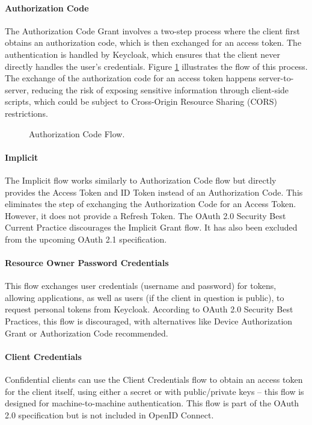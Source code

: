 \paragraph{Authorization Code}\label{sec:auth_code}
The Authorization Code Grant involves a two-step process where the client first obtains an authorization code, which is then exchanged for an access token. The authentication is handled by Keycloak, which ensures that the client never directly handles the user's credentials. Figure \ref{fig:authorization_code_flow} illustrates the flow of this process. The exchange of the authorization code for an access token happens server-to-server, reducing the risk of exposing sensitive information through client-side scripts, which could be subject to Cross-Origin Resource Sharing (CORS) restrictions.

\begin{figure}[h]
    \centering
    
    \caption{Authorization Code Flow.}
    \label{fig:authorization_code_flow}
\end{figure}

\paragraph{Implicit}
The Implicit flow works similarly to Authorization Code flow but directly provides the Access Token and ID Token instead of an Authorization Code. This eliminates the step of exchanging the Authorization Code for an Access Token. However, it does not provide a Refresh Token. The OAuth 2.0 Security Best Current Practice discourages the Implicit Grant flow. It has also been excluded from the upcoming OAuth 2.1 specification.

\paragraph{Resource Owner Password Credentials}
This flow exchanges user credentials (username and password) for tokens, allowing applications, as well as users (if the client in question is public), to request personal tokens from Keycloak. According to OAuth 2.0 Security Best Practices, this flow is discouraged, with alternatives like Device Authorization Grant or Authorization Code recommended. 

\paragraph{Client Credentials} Confidential clients can use the Client Credentials flow to obtain an access token for the client itself, using either a secret or with public/private keys -- this flow is designed for machine-to-machine authentication. This flow is part of the OAuth 2.0 specification but is not included in OpenID Connect.


